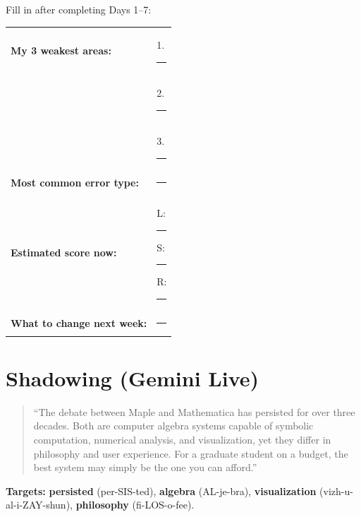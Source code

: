 \documentclass[10pt,a4paper]{article}
\begin{document}
\begin{tcolorbox}[colback=white, colframe=black]
Fill in after completing Days 1--7:

\begin{tabular}{ll}
\textbf{My 3 weakest areas:} & 1. \rule{4cm}{0.4pt} \\
& 2. \rule{4cm}{0.4pt} \\
& 3. \rule{4cm}{0.4pt} \\[6pt]
\textbf{Most common error type:} & \rule{5cm}{0.4pt} \\[6pt]
\textbf{Estimated score now:} & L: \rule{1cm}{0.4pt}
S: \rule{1cm}{0.4pt} R: \rule{1cm}{0.4pt} \\[6pt]
\textbf{What to change next week:} & \rule{5cm}{0.4pt} \\
\end{tabular}
\end{tcolorbox}

\section*{Shadowing (Gemini Live)}

\begin{quote}\small
``The debate between Maple and Mathematica has persisted for over
three decades. Both are computer algebra systems capable of symbolic
computation, numerical analysis, and visualization, yet they differ
in philosophy and user experience. For a graduate student on a
budget, the best system may simply be the one you can afford.''
\end{quote}

\textbf{Targets:} \textbf{persisted} (per-SIS-ted), \textbf{algebra}
(AL-je-bra), \textbf{visualization} (vizh-u-al-i-ZAY-shun),
\textbf{philosophy} (fi-LOS-o-fee).
\end{document}
